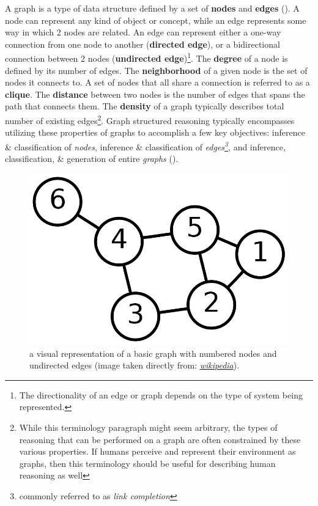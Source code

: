 \documentclass[12pt]{article}
\let\oldcite=\cite
\renewcommand{\cite}[1]{\textcolor[rgb]{0, .121, .388}{\oldcite{#1}}}
\begin{document}
A graph is a type of data structure defined by a set of \textbf{nodes} and \textbf{edges} (\cite{newman2003structure}). A node can represent any kind of object or concept, while an edge represents some way in which 2 nodes are related. An edge can represent either a one-way connection from one node to another (\textbf{directed edge}), or a bidirectional connection between 2 nodes (\textbf{undirected edge})\footnote{ The directionality of an edge or graph depends on the type of system being represented.}. The \textbf{degree} of a node is defined by its number of edges. The \textbf{neighborhood} of a given node is the set of nodes it connects to. A set of nodes that all share a connection is referred to as a \textbf{clique}. The \textbf{distance} between two nodes is the number of edges that spans the path that connects them. The \textbf{density} of a graph typically describes total number of existing edges\footnote{ While this terminology paragraph might seem arbitrary, the types of reasoning that can be performed on a graph are often constrained by these various properties. If humans perceive and represent their environment as graphs, then this terminology should be useful for describing human reasoning as well}. Graph structured reasoning typically encompasses utilizing these properties of graphs to accomplish a few key objectives: inference \& classification of \emph{nodes}, inference \& classification of \emph{edges\footnote{ commonly referred to as \emph{link completion}}}, and inference, classification, \& generation of entire \emph{graphs} (\cite{wu2020comprehensive}). 

\begin{figure}
    \centering
    \label{fig:basicGraph}
    \caption[basic graph]{a visual representation of a basic graph with numbered nodes and undirected edges (image taken directly from: \href{http://en.wikipedia.org/wiki/Graph_theory}{\emph{wikipedia}}).}
    \includegraphics[width=.6\textwidth]{figures/basicGraph.png}
\end{figure} 
\end{document}
